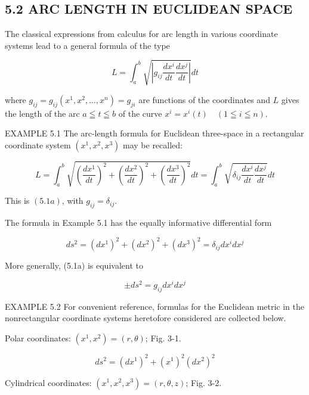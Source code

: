 \documentclass[10pt]{article}
\begin{document}
\subsection*{5.2 ARC LENGTH IN EUCLIDEAN SPACE}
The classical expressions from calculus for arc length in various coordinate systems lead to a general formula of the type


\begin{equation*}
L=\int_{a}^{b} \sqrt{\left|g_{i j} \frac{d x^{i}}{d t} \frac{d x^{j}}{d t}\right|} d t \tag{5.1a}
\end{equation*}


where $g_{i j}=g_{i j}\left(x^{1}, x^{2}, \ldots, x^{n}\right)=g_{j i}$ are functions of the coordinates and $L$ gives the length of the arc $a \leqq t \leqq b$ of the curve $x^{i}=x^{i}(t) \quad(1 \leqq i \leqq n)$.

EXAMPLE 5.1 The arc-length formula for Euclidean three-space in a rectangular coordinate system $\left(x^{1}, x^{2}, x^{3}\right)$ may be recalled:

$$
L=\int_{a}^{b} \sqrt{\left(\frac{d x^{1}}{d t}\right)^{2}+\left(\frac{d x^{2}}{d t}\right)^{2}+\left(\frac{d x^{3}}{d t}\right)^{2}} d t=\int_{a}^{b} \sqrt{\delta_{i j} \frac{d x^{i}}{d t} \frac{d x^{j}}{d t}} d t
$$

This is $(5.1 a)$, with $g_{i j}=\delta_{i j}$.

The formula in Example 5.1 has the equally informative differential form

$$
d s^{2}=\left(d x^{1}\right)^{2}+\left(d x^{2}\right)^{2}+\left(d x^{3}\right)^{2}=\delta_{i j} d x^{i} d x^{j}
$$

More generally, (5.1a) is equivalent to


\begin{equation*}
\pm d s^{2}=g_{i j} d x^{i} d x^{j} \tag{5.1b}
\end{equation*}


EXAMPLE 5.2 For convenient reference, formulas for the Euclidean metric in the nonrectangular coordinate systems heretofore considered are collected below.

Polar coordinates: $\left(x^{1}, x^{2}\right)=(r, \theta)$; Fig. 3-1.


\begin{equation*}
d s^{2}=\left(d x^{1}\right)^{2}+\left(x^{1}\right)^{2}\left(d x^{2}\right)^{2} \tag{5.2}
\end{equation*}


Cylindrical coordinates: $\left(x^{1}, x^{2}, x^{3}\right)=(r, \theta, z)$; Fig. 3-2.
\end{document}
